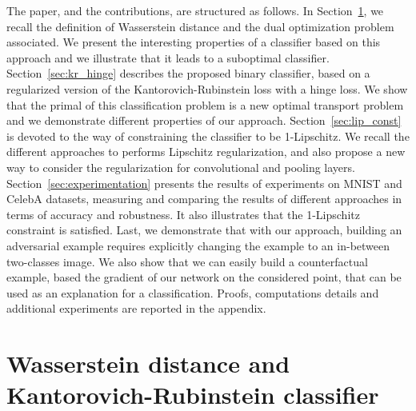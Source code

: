 \documentclass{article}
\begin{document}
The paper, and the contributions, are structured as follows. In Section~\ref{sec:wass_distance}, we recall the definition of Wasserstein distance and the dual optimization problem associated. We present the interesting properties of a classifier based on this approach and we illustrate that it leads to a suboptimal classifier. Section~\ref{sec:kr_hinge} describes the proposed binary classifier, based on a regularized version of the Kantorovich-Rubinstein loss with a hinge loss. We show that the primal of this classification problem is a new optimal transport problem and we demonstrate different properties of our approach. Section~\ref{sec:lip_const} is devoted to the way of constraining the classifier to be  1-Lipschitz. We recall the different approaches to performs Lipschitz regularization, 
and also propose a new way to consider the regularization for convolutional and pooling layers. Section~\ref{sec:experimentation} presents the results of  experiments on MNIST and CelebA datasets, measuring and comparing the results of different approaches in terms of accuracy and robustness. It also illustrates that the 1-Lipschitz constraint is satisfied. Last, we demonstrate that with our approach, building an adversarial example requires explicitly changing the example to an in-between two-classes image. We also show that we can easily build a counterfactual example, based the gradient of our network on the considered point, that can be used as an explanation for a classification. Proofs, computations details and additional experiments are reported in the appendix. 










\section{Wasserstein distance and Kantorovich-Rubinstein classifier}
\label{sec:wass_distance}
\end{document}
